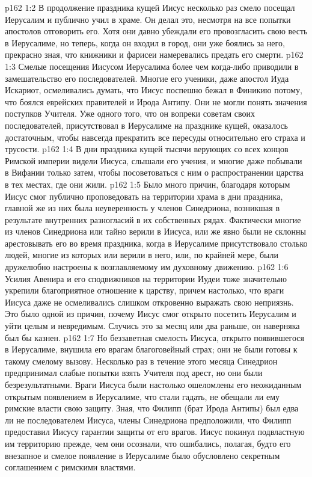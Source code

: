 \vs p162 1:2 В продолжение праздника кущей Иисус несколько раз смело посещал Иерусалим и публично учил в храме. Он делал это, несмотря на все попытки апостолов отговорить его. Хотя они давно убеждали его провозгласить свою весть в Иерусалиме, но теперь, когда он входил в город, они уже боялись за него, прекрасно зная, что книжники и фарисеи намеревались предать его смерти.
\vs p162 1:3 Смелые посещения Иисусом Иерусалима более чем когда\hyp{}либо приводили в замешательство его последователей. Многие его ученики, даже апостол Иуда Искариот, осмеливались думать, что Иисус поспешно бежал в Финикию потому, что боялся еврейских правителей и Ирода Антипу. Они не могли понять значения поступков Учителя. Уже одного того, что он вопреки советам своих последователей, присутствовал в Иерусалиме на празднике кущей, оказалось достаточным, чтобы навсегда прекратить все пересуды относительно его страха и трусости.
\vs p162 1:4 В дни праздника кущей тысячи верующих со всех концов Римской империи видели Иисуса, слышали его учения, и многие даже побывали в Вифании только затем, чтобы посоветоваться с ним о распространении царства в тех местах, где они жили.
\vs p162 1:5 Было много причин, благодаря которым Иисус смог публично проповедовать на территории храма в дни праздника, главной же из них была неуверенность у членов Синедриона, возникшая в результате внутренних разногласий в их собственных рядах. Фактически многие из членов Синедриона или тайно верили в Иисуса, или же явно были не склонны арестовывать его во время праздника, когда в Иерусалиме присутствовало столько людей, многие из которых или верили в него, или, по крайней мере, были дружелюбно настроены к возглавляемому им духовному движению.
\vs p162 1:6 Усилия Авенира и его сподвижников на территории Иудеи тоже значительно укрепили благоприятное отношение к царству, причем настолько, что враги Иисуса даже не осмеливались слишком откровенно выражать свою неприязнь. Это было одной из причин, почему Иисус смог открыто посетить Иерусалим и уйти целым и невредимым. Случись это за месяц или два раньше, он наверняка был бы казнен.
\vs p162 1:7 Но беззаветная смелость Иисуса, открыто появившегося в Иерусалиме, внушила его врагам благоговейный страх; они не были готовы к такому смелому вызову. Несколько раз в течение этого месяца Синедрион предпринимал слабые попытки взять Учителя под арест, но они были безрезультатными. Враги Иисуса были настолько ошеломлены его неожиданным открытым появлением в Иерусалиме, что стали гадать, не обещали ли ему римские власти свою защиту. Зная, что Филипп (брат Ирода Антипы) был едва ли не последователем Иисуса, члены Синедриона предположили, что Филипп предоставил Иисусу гарантии защиты от его врагов. Иисус покинул подвластную им территорию прежде, чем они осознали, что ошибались, полагая, будто его внезапное и смелое появление в Иерусалиме было обусловлено секретным соглашением с римскими властями.
